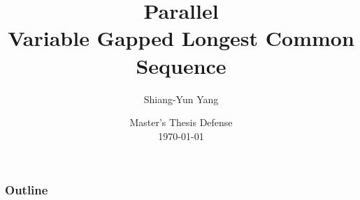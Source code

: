 \documentclass{beamer}
\title{Parallel \\ Variable Gapped Longest Common Sequence}
\author{Shiang-Yun Yang}
\institute{Department of Computer Science \& Information Engineering\\
National Taiwan University}
\date{Master's Thesis Defense\\\today}
\begin{document}
\begin{frame}
    \titlepage
\end{frame}

\begin{frame}
    \frametitle{Outline}
    \tableofcontents[hideallsubsections]
\end{frame}







\end{document}
